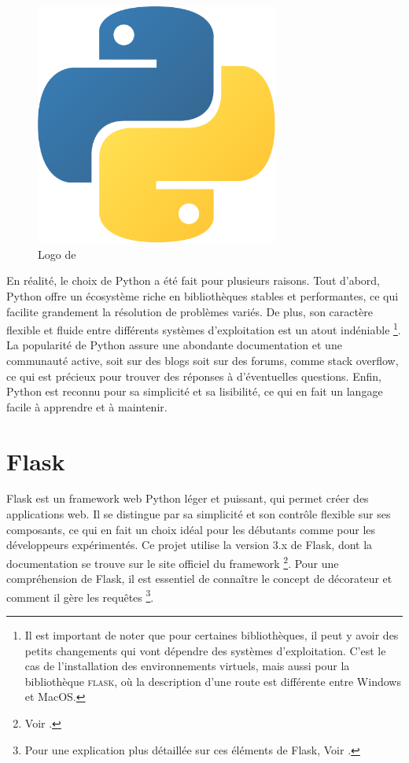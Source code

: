         \begin{figure}[h!]
            \centering
            \includegraphics[width=8cm]{02_images/part_01/05_python_logo.png}
            \caption{Logo de \py}
        \end{figure}

        En réalité, le choix de Python a été fait pour plusieurs raisons. Tout d'abord, Python offre un écosystème riche en bibliothèques stables et performantes, ce qui facilite grandement la résolution de problèmes variés. De plus, son caractère flexible et fluide entre différents systèmes d'exploitation est un atout indéniable \footnote{Il est important de noter que pour certaines bibliothèques, il peut y avoir des petits changements qui vont dépendre des systèmes d'exploitation. C'est le cas de l'installation des environnements virtuels, mais aussi pour la bibliothèque \py \textsc{flask}, où la description d'une route est différente entre Windows et MacOS.}. La popularité de Python assure une abondante documentation et une communauté active, soit sur des blogs soit sur des forums, comme stack overflow, ce qui est précieux pour trouver des réponses à d'éventuelles questions. Enfin, Python est reconnu pour sa simplicité et sa lisibilité, ce qui en fait un langage facile à apprendre et à maintenir.

        \section{Flask}
        Flask est un framework web Python léger et puissant, qui permet créer des applications web. Il se distingue par sa simplicité et son contrôle flexible sur ses composants, ce qui en fait un choix idéal pour les débutants comme pour les développeurs expérimentés. Ce projet utilise la version 3.x de Flask, dont la documentation se trouve sur le site officiel du framework \footnote{Voir \cite{flask_documentation}.}. Pour une compréhension de Flask, il est essentiel de connaître le concept de décorateur et comment il gère les requêtes   \footnote{Pour une explication plus détaillée sur ces éléments de Flask, Voir \cite{moraneus_python_flask_2023}.}.  


